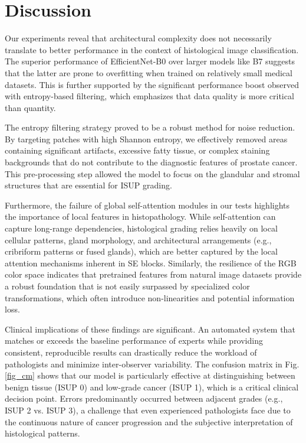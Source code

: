 \documentclass[10pt,conference]{IEEEtran}
\begin{document}
\section{Discussion}
Our experiments reveal that architectural complexity does not necessarily translate to better performance in the context of histological image classification.
 The superior performance of EfficientNet-B0 over larger models like B7 suggests that the latter are prone to overfitting when trained on relatively small medical datasets. This is further supported by the significant performance boost observed with entropy-based filtering, which emphasizes that data quality is more critical than quantity. 

The entropy filtering strategy proved to be a robust method for noise reduction. By targeting patches with high Shannon entropy, we effectively removed areas containing significant artifacts, excessive fatty tissue, or complex staining backgrounds that do not contribute to the diagnostic features of prostate cancer. This pre-processing step allowed the model to focus on the glandular and stromal structures that are essential for ISUP grading.

Furthermore, the failure of global self-attention modules in our tests highlights the importance of local features in histopathology. While self-attention can capture long-range dependencies, histological grading relies heavily on local cellular patterns, gland morphology, and architectural arrangements (e.g., cribriform patterns or fused glands), which are better captured by the local attention mechanisms inherent in SE blocks. Similarly, the resilience of the RGB color space indicates that pretrained features from natural image datasets provide a robust foundation that is not easily surpassed by specialized color transformations, which often introduce non-linearities and potential information loss.

Clinical implications of these findings are significant. An automated system that matches or exceeds the baseline performance of experts while providing consistent, reproducible results can drastically reduce the workload of pathologists and minimize inter-observer variability. The confusion matrix in Fig. \ref{fig_cm} shows that our model is particularly effective at distinguishing between benign tissue (ISUP 0) and low-grade cancer (ISUP 1), which is a critical clinical decision point. Errors predominantly occurred between adjacent grades (e.g., ISUP 2 vs. ISUP 3), a challenge that even experienced pathologists face due to the continuous nature of cancer progression and the subjective interpretation of histological patterns.
\end{document}
